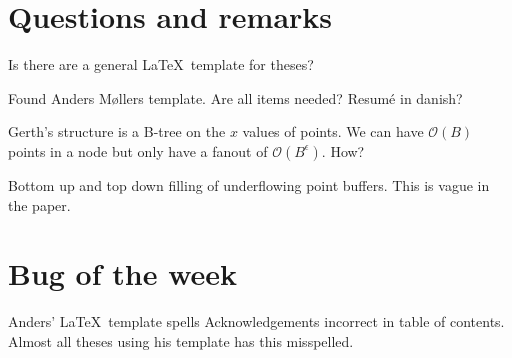 \documentclass[a4paper,11pt,agenda,chair]{meetingmins}
\begin{document}
\section{Questions and remarks}
\begin{items}
	\item Is there are a general \LaTeX~template for theses?
		\begin{items}
			\item Found Anders M\o llers template. Are all items needed? Resum\'e in danish?
		\end{items}
\item Gerth's structure is a B-tree on the $x$ values of points. We can have $\mathcal{O}(B)$ points in a node but only have a fanout of $\mathcal{O}(B^\epsilon)$. How?

\item Bottom up and top down filling of underflowing point buffers. This is vague in the paper.

\end{items}



\section{Bug of the week}
Anders' \LaTeX~template spells Acknowledgements incorrect in table of contents. Almost all theses using his template has this misspelled.
\end{document}

